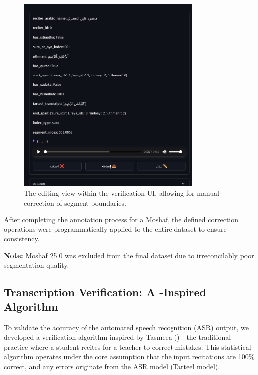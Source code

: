 \begin{figure}[H]
\centering
\includegraphics[width=0.8\textwidth]{../figures/data_annotation_ui_editing.png}
\caption{The editing view within the verification UI, allowing for manual correction of segment boundaries.}
\label{fig:annotation_ui}
\end{figure}

After completing the annotation process for a Moshaf, the defined correction operations were programmatically applied to the entire dataset to ensure consistency.

\textbf{Note:} Moshaf 25.0 was excluded from the final dataset due to irreconcilably poor segmentation quality.

\subsection{Transcription Verification: A -Inspired Algorithm}

To validate the accuracy of the automated speech recognition (ASR) output, we developed a verification algorithm inspired by Tasmeea ()—the traditional practice where a student recites for a teacher to correct mistakes. This statistical algorithm operates under the core assumption that the input recitations are 100\% correct, and any errors originate from the ASR model (Tarteel model).

